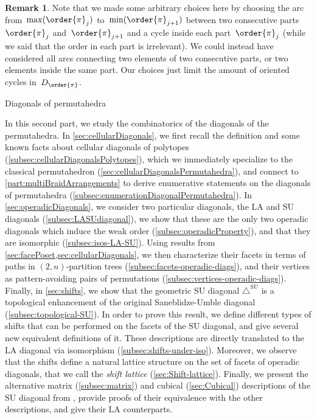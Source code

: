 \documentclass{amsart}
\makeatletter
\theoremstyle{definition}
\newtheorem{remark}[theorem]{Remark}
\newcommand{\SU}{\mathrm{SU}}
\newcommand{\LA}{\mathrm{LA}}
\newcommand{\SUD}{\triangle^{\mathrm{SU}}}
\def\part{\@startsection{part}{1}%
\z@{.7\linespacing\@plus\linespacing}{.8\linespacing}%
{\LARGE\sffamily\centering}}
\makeatother
\begin{document}
\begin{remark}
Note that we made some arbitrary choices here by choosing the arc from~$\max(\order{\pi}_j)$ to~$\min(\order{\pi}_{j+1})$ between two consecutive parts~$\order{\pi}_j$ and~$\order{\pi}_{j+1}$ and a cycle inside each part~$\order{\pi}_j$ (while we said that the order in each part is irrelevant).
We could instead have considered all arcs connecting two elements of two consecutive parts, or two elements inside the same part.
Our choices just limit the amount of oriented cycles in~$D_{\order{\pi}}$.
\end{remark}


\clearpage
\part{Diagonals of permutahedra}
\label{part:diagonalsPermutahedra}

In this second part, we study the combinatorics of the diagonals of the permutahedra.
In \cref{sec:cellularDiagonals}, we first recall the definition and some known facts about cellular diagonals of polytopes (\cref{subsec:cellularDiagonalsPolytopes}), which we immediately specialize to the classical permutahedron (\cref{sec:cellularDiagonalsPermutahedra}), and connect to \cref{part:multiBraidArrangements} to derive enumerative statements on the diagonals of permutahedra (\cref{subsec:enumerationDiagonalPermutahedra}).
In \cref{sec:operadicDiagonals}, we consider two particular diagonals, the $\LA$ and $\SU$ diagonals (\cref{subsec:LASUdiagonal}), we show that these are the only two operadic diagonals which induce the weak order (\cref{subsec:operadicProperty}), and that they are isomorphic (\cref{subsec:isos-LA-SU}). 
Using results from \cref{sec:facePoset,sec:cellularDiagonals}, we then characterize their facets in terms of paths in $(2,n)$-partition trees (\cref{subsec:facets-operadic-diags}), and their vertices as pattern-avoiding pairs of permutations (\cref{subsec:vertices-operadic-diags}).
Finally, in \cref{sec:shifts}, we show that the geometric $\SU$ diagonal $\SUD$ is a topological enhancement of the original Saneblidze-Umble diagonal~\cite{SaneblidzeUmble} (\cref{subsec:topological-SU}).
In order to prove this result, we define different types of shifts that can be performed on the facets of the $\SU$ diagonal, and give several new equivalent definitions of it. 
These descriptions are directly translated to the $\LA$ diagonal via isomorphism (\cref{subsec:shifts-under-iso}).
Moreover, we observe that the shifts define a natural lattice structure on the set of facets of operadic diagonals, that we call the \emph{shift lattice} (\cref{sec:Shift-lattice}).
Finally, we present the alternative matrix (\cref{subsec:matrix}) and cubical (\cref{sec:Cubical}) descriptions of the $\SU$ diagonal from \cite{SaneblidzeUmble,SaneblidzeUmble-comparingDiagonals}, provide proofs of their equivalence with the other descriptions, and give their $\LA$ counterparts. 
\end{document}
